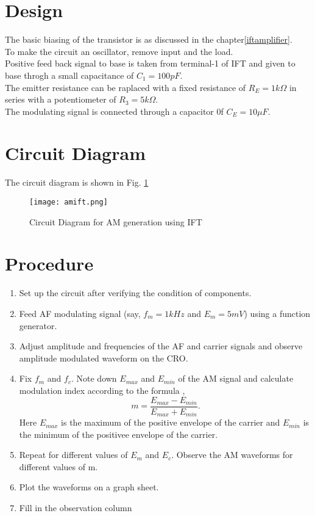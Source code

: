 \section*{Design}
The basic biasing of the transistor is as discussed in the chapter\ref{iftamplifier}.\\
To make the circuit an oscillator, remove input and the load.\\
Positive feed back signal to base is taken from terminal-1 of IFT and given to base throgh a small capacitance of $C_1=100 pF$. \\
The emitter resistance can be raplaced with a fixed resistance of $R_E=1k\Omega$ in series with a potentiometer of $R_3=5k\Omega$.\\
The modulating signal is connected through a capacitor 0f $C_E=10\mu F$.
\section*{Circuit Diagram}
The circuit diagram is shown in Fig. \ref{amiftpng}
\begin{figure}
\texttt{[image: amift.png]}
\caption{Circuit Diagram for AM generation using IFT}
\label{amiftpng}
\end{figure}
\section*{Procedure}

\begin{enumerate}
\item
Set up the circuit after verifying the condition of components.
\item
Feed AF modulating signal (say, $f_m=1kHz$ and $E_m=5mV$) using a function generator.
\item
Adjust amplitude and frequencies of the AF and carrier signals and observe amplitude modulated waveform on the CRO.
\item
Fix $f_m$ and $f_c$. Note down $E_{max}$ and $E_{min}$ of the AM signal and calculate modulation index according to the formula ,
\begin{equation}
m=\frac{E_{max}-E_{min}}{E_{max}+E_{min}}.
\end{equation}
Here $E_{max}$ is the maximum of the positive envelope of the carrier and $E_{min}$ is the minimum of the positivee envelope of the carrier.
\item
Repeat for different values of $E_m$ and $E_c$. Observe the AM waveforms for different values of m.
\item
Plot the waveforms on a graph sheet.
\item

Fill in the observation column
\end{enumerate}


